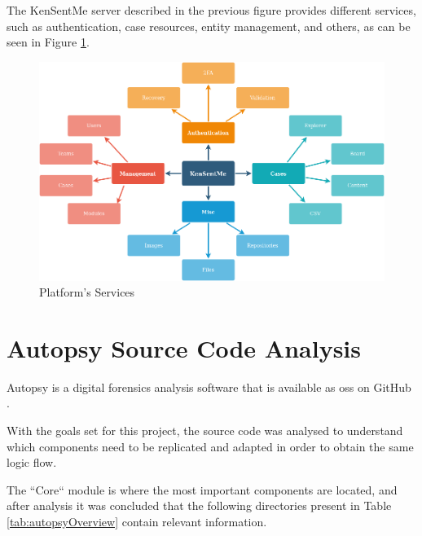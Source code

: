 The KenSentMe server described in the previous figure provides different services, such as authentication, case resources, entity management, and others, as can be seen in Figure \ref{fig:services}.

\begin{figure}[ht]
 \centering
 \includegraphics[width=1\linewidth]{imgs/services.png}
 \caption{Platform's Services}
 \label{fig:services}
\end{figure}

\section{Autopsy Source Code Analysis}

Autopsy is a digital forensics analysis software that is available as \acrfull{oss} \cite{opensource} on GitHub \cite{github}.

With the goals set for this project, the source code was analysed to understand which components need to be replicated and adapted in order to obtain the same logic flow.

The ``Core`` module \cite{core} is where the most important components are located, and after analysis it was concluded that the following directories present in Table \ref{tab:autopsyOverview} contain relevant information.


\pagebreak

